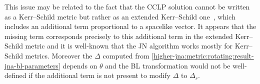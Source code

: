 This issue may be related to the fact that the CCLP solution cannot be written as a Kerr--Schild metric but rather as an extended Kerr--Schild one~\cite{Aliev:2009:NoteRotatingCharged, Ett:2010:ExtendedKerrSchildAnsatz, Malek:2014:ExtendedKerrSchildSpacetimes}, which includes an additional term proportional to a spacelike vector.
It appears that the missing term corresponds precisely to this additional term in the extended Kerr--Schild metric and it is well-known that the JN algorithm works mostly for Kerr--Schild metrics.
Moreover the $\Delta$ computed from \eqref{higher-jna:metric:rotating:result-jna-bl-parameters} depends on $\theta$ and the BL transformation would not be well-defined if the additional term is not present to modify $\Delta$ to $\Delta_r$.


